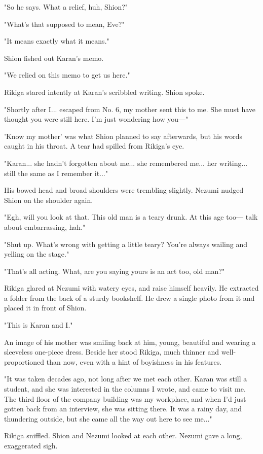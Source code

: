 "So he says. What a relief, huh, Shion?"

"What's that supposed to mean, Eve?"

"It means exactly what it means."

Shion fished out Karan's memo.


"We relied on this memo to get us here."

Rikiga stared intently at Karan's scribbled writing. Shion spoke.

"Shortly after I... escaped from No. 6, my mother sent this to me. She
must have thought you were still here. I'm just wondering how you―"

'Know my mother' was what Shion planned to say afterwards, but his words
caught in his throat. A tear had spilled from Rikiga's eye.

"Karan... she hadn't forgotten about me... she remembered me... her
writing... still the same as I remember it..."

His bowed head and broad shoulders were trembling slightly. Nezumi
nudged Shion on the shoulder again.

"Egh, will you look at that. This old man is a teary drunk. At this age
too― talk about embarrassing, hah."

"Shut up. What's wrong with getting a little teary? You're always
wailing and yelling on the stage."

"That's all acting. What, are you saying yours is an act too, old man?"

Rikiga glared at Nezumi with watery eyes, and raise himself heavily. He
extracted a folder from the back of a sturdy bookshelf. He drew a single
photo from it and placed it in front of Shion.

"This is Karan and I."

An image of his mother was smiling back at him, young, beautiful and
wearing a sleeveless one-piece dress. Beside her stood Rikiga, much
thinner and well-proportioned than now, even with a hint of boyishness
in his features.

"It was taken decades ago, not long after we met each other. Karan was
still a student, and she was interested in the columns I wrote, and came
to visit me. The third floor of the company building was my workplace,
and when I'd just gotten back from an interview, she was sitting there.
It was a rainy day, and thundering outside, but she came all the way out
here to see me..."

Rikiga sniffled. Shion and Nezumi looked at each other. Nezumi gave a
long, exaggerated sigh.


